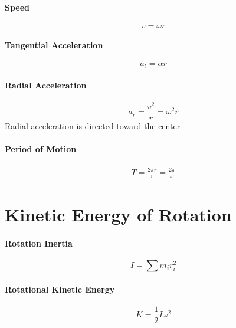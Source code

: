 \documentclass{article}
\begin{document}
        \paragraph{Speed}
        \begin{equation}
            v = \omega r
        \end{equation}

        \paragraph{Tangential Acceleration}
        \begin{equation}
            a_t = \alpha r
        \end{equation}

        \paragraph{Radial Acceleration}
        \begin{equation}
            a_r = \frac{v^2}{r} = \omega^2 r
        \end{equation}
        Radial acceleration is directed toward the center

        \paragraph{Period of Motion}
        \begin{eqnarray}
            T = \frac{2 \pi r}{v} = \frac{2 \pi}{\omega}
        \end{eqnarray}

    \section{Kinetic Energy of Rotation}

        \paragraph{Rotation Inertia}
        \begin{equation}
            I = \sum m_i r_i^2
        \end{equation}

        \paragraph{Rotational Kinetic Energy}
        \begin{equation}
            K = \frac{1}{2} I \omega^2
        \end{equation}
\end{document}
